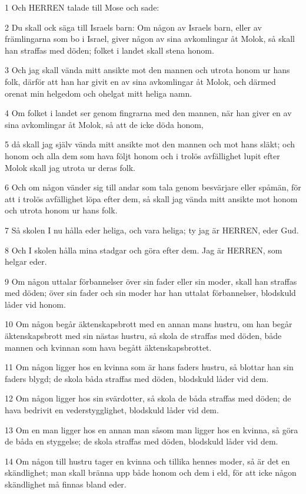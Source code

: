 \par 1 Och HERREN talade till Mose och sade:
\par 2 Du skall ock säga till Israels barn: Om någon av Israels barn, eller av främlingarna som bo i Israel, giver någon av sina avkomlingar åt Molok, så skall han straffas med döden; folket i landet skall stena honom.
\par 3 Och jag skall vända mitt ansikte mot den mannen och utrota honom ur hans folk, därför att han har givit en av sina avkomlingar åt Molok, och därmed orenat min helgedom och ohelgat mitt heliga namn.
\par 4 Om folket i landet ser genom fingrarna med den mannen, när han giver en av sina avkomlingar åt Molok, så att de icke döda honom,
\par 5 då skall jag själv vända mitt ansikte mot den mannen och mot hans släkt; och honom och alla dem som hava följt honom och i trolös avfällighet lupit efter Molok skall jag utrota ur deras folk.
\par 6 Och om någon vänder sig till andar som tala genom besvärjare eller spåmän, för att i trolös avfällighet löpa efter dem, så skall jag vända mitt ansikte mot honom och utrota honom ur hans folk.
\par 7 Så skolen I nu hålla eder heliga, och vara heliga; ty jag är HERREN, eder Gud.
\par 8 Och I skolen hålla mina stadgar och göra efter dem. Jag är HERREN, som helgar eder.
\par 9 Om någon uttalar förbannelser över sin fader eller sin moder, skall han straffas med döden; över sin fader och sin moder har han uttalat förbannelser, blodskuld låder vid honom.
\par 10 Om någon begår äktenskapsbrott med en annan mans hustru, om han begår äktenskapsbrott med sin nästas hustru, så skola de straffas med döden, både mannen och kvinnan som hava begått äktenskapsbrottet.
\par 11 Om någon ligger hos en kvinna som är hans faders hustru, så blottar han sin faders blygd; de skola båda straffas med döden, blodskuld låder vid dem.
\par 12 Om någon ligger hos sin svärdotter, så skola de båda straffas med döden; de hava bedrivit en vederstygglighet, blodskuld låder vid dem.
\par 13 Om en man ligger hos en annan man såsom man ligger hos en kvinna, så göra de båda en styggelse; de skola straffas med döden, blodskuld låder vid dem.
\par 14 Om någon till hustru tager en kvinna och tillika hennes moder, så är det en skändlighet; man skall bränna upp både honom och dem i eld, för att icke någon skändlighet må finnas bland eder.
